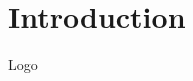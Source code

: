 \documentclass[
    ref = refDemo,
]{spBeamer}
\begin{document}
    \section{Introduction}
        \begin{frame}{Logo}
        \end{frame}
    
\end{document}
